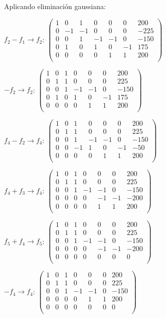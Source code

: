 \begin{prob}
\begin{myproof}
Aplicando eliminación gaussiana:

$f_2 - f_1 \rightarrow f_2$: $\left( \begin{array}{cccccc|c}
1&0&1&0&0&0&200\\
0&-1&-1&0&0&0&-225\\
0&0&1&-1&-1&0&-150\\
0&1&0&1&0&-1&175\\
0&0&0&0&1&1&200\\
\end{array}\right)$

$-f_2 \rightarrow f_2$: $\left( \begin{array}{cccccc|c}
1&0&1&0&0&0&200\\
0&1&1&0&0&0&225\\
0&0&1&-1&-1&0&-150\\
0&1&0&1&0&-1&175\\
0&0&0&0&1&1&200\\
\end{array}\right)$

$f_4 - f_2 \rightarrow f_4$: $\left( \begin{array}{cccccc|c}
1&0&1&0&0&0&200\\
0&1&1&0&0&0&225\\
0&0&1&-1&-1&0&-150\\
0&0&-1&1&0&-1&-50\\
0&0&0&0&1&1&200\\
\end{array}\right)$

$f_4 + f_3 \rightarrow f_4$: $\left( \begin{array}{cccccc|c}
1&0&1&0&0&0&200\\
0&1&1&0&0&0&225\\
0&0&1&-1&-1&0&-150\\
0&0&0&0&-1&-1&-200\\
0&0&0&0&1&1&200\\
\end{array}\right)$

$f_5 + f_4 \rightarrow f_5$: $\left( \begin{array}{cccccc|c}
1&0&1&0&0&0&200\\
0&1&1&0&0&0&225\\
0&0&1&-1&-1&0&-150\\
0&0&0&0&-1&-1&-200\\
0&0&0&0&0&0&0\\
\end{array}\right)$

$-f_4 \rightarrow f_4$: $\left( \begin{array}{cccccc|c}
1&0&1&0&0&0&200\\
0&1&1&0&0&0&225\\
0&0&1&-1&-1&0&-150\\
0&0&0&0&1&1&200\\
0&0&0&0&0&0&0\\
\end{array}\right)$


\end{myproof}
\end{prob}
